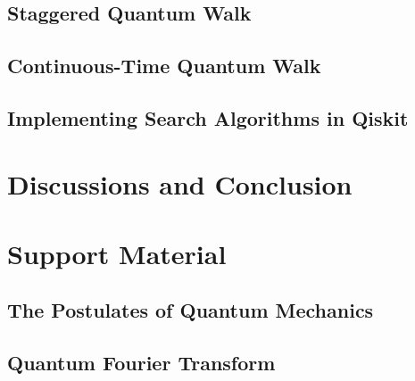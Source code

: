 \documentclass[
oneside,
11pt, a4paper,
footinclude=true,
headinclude=true,
cleardoublepage=empty
]{scrbook}
\begin{document}
\section{Staggered Quantum Walk}\label{sec:StagQiskit}

\section{Continuous-Time Quantum Walk}\label{sec:ContQiskit}

\section{Implementing Search Algorithms in Qiskit}\label{sec:SearchProblemsQiskit}


\chapter{Discussions and Conclusion}








\chapter{Support Material}
\section{The Postulates of Quantum Mechanics}\label{sec:PostulatesQM}

\section{Quantum Fourier Transform}\label{sec:chapQFT}

\end{document}
